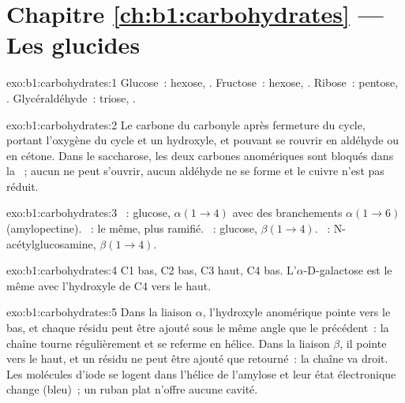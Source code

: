 \section*{Chapitre \ref{ch:b1:carbohydrates} --- Les glucides}

\begin{solution}{exo:b1:carbohydrates:1}
Glucose~: hexose, . Fructose~: hexose, . Ribose~: pentose,
. Glycéraldéhyde~: triose, .
\end{solution}

\begin{solution}{exo:b1:carbohydrates:2}
Le carbone du carbonyle après fermeture du cycle, portant l'oxygène du
cycle et un hydroxyle, et pouvant se rouvrir en aldéhyde ou en cétone.
Dans le saccharose, les deux carbones anomériques sont bloqués dans la
~; aucun ne peut s'ouvrir, aucun aldéhyde ne se forme et
le cuivre n'est pas réduit.
\end{solution}

\begin{solution}{exo:b1:carbohydrates:3}
~: glucose, $\alpha(1{\to}4)$ avec des branchements
$\alpha(1{\to}6)$ (amylopectine). ~: le même, plus ramifié.
~: glucose, $\beta(1{\to}4)$. ~: N-acétylglucosamine,
$\beta(1{\to}4)$.
\end{solution}

\begin{solution}{exo:b1:carbohydrates:4}
C1 bas, C2 bas, C3 haut, C4 bas. L'$\alpha$-D-galactose est le même avec
l'hydroxyle de C4 vers le haut.
\end{solution}

\begin{solution}{exo:b1:carbohydrates:5}
Dans la liaison $\alpha$, l'hydroxyle anomérique pointe vers le bas, et
chaque résidu peut être ajouté sous le même angle que le précédent~: la
chaîne tourne régulièrement et se referme en hélice. Dans la liaison
$\beta$, il pointe vers le haut, et un résidu ne peut être ajouté que
retourné~: la chaîne va droit. Les molécules d'iode se logent dans
l'hélice de l'amylose et leur état électronique change (bleu)~; un ruban
plat n'offre aucune cavité.
\end{solution}

